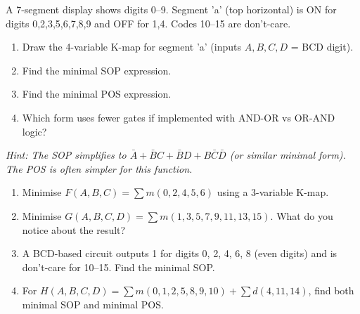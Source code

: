 \documentclass[11pt]{article}
\begin{document}
\begin{experience}
A 7-segment display shows digits 0--9. Segment 'a' (top horizontal) is ON for digits 0,2,3,5,6,7,8,9 and OFF for 1,4. Codes 10--15 are don't-care.
\begin{enumerate}
\item Draw the 4-variable K-map for segment 'a' (inputs $A,B,C,D$ = BCD digit).
\item Find the minimal SOP expression.
\item Find the minimal POS expression.
\item Which form uses fewer gates if implemented with AND-OR vs OR-AND logic?
\end{enumerate}
\textit{Hint: The SOP simplifies to $\bar{A} + \bar{B}C + \bar{B}D + B\bar{C}\bar{D}$ (or similar minimal form). The POS is often simpler for this function.}
\end{experience}

\begin{exercice}[Practice]
\begin{enumerate}
\item Minimise $F(A,B,C) = \sum m(0, 2, 4, 5, 6)$ using a 3-variable K-map.
\item Minimise $G(A,B,C,D) = \sum m(1, 3, 5, 7, 9, 11, 13, 15)$. What do you notice about the result?
\item A BCD-based circuit outputs 1 for digits 0, 2, 4, 6, 8 (even digits) and is don't-care for 10--15. Find the minimal SOP.
\item For $H(A,B,C,D) = \sum m(0, 1, 2, 5, 8, 9, 10) + \sum d(4, 11, 14)$, find both minimal SOP and minimal POS.
\end{enumerate}
\end{exercice}
\end{document}
